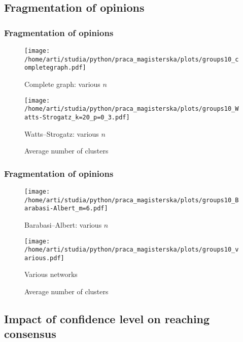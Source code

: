 \documentclass[a4paper, 11pt]{beamer}
\begin{document}
\subsection{Fragmentation of opinions}

\begin{frame}
\frametitle{Fragmentation of opinions}
	\begin{figure}[ht]
		\begin{minipage}[b]{0.45\linewidth}
            \centering
            \texttt{[image: /home/arti/studia/python/praca\_magisterska/plots/groups10\_completegraph.pdf]}
            \caption{Complete graph: various $n$}
        \end{minipage}
        \hspace{0.5cm}
        \begin{minipage}[b]{0.45\linewidth}
            \centering
            \texttt{[image: /home/arti/studia/python/praca\_magisterska/plots/groups10\_Watts-Strogatz\_k=20\_p=0\_3.pdf]}
            \caption{Watts--Strogatz: various $n$}
        \end{minipage}
    \caption{Average number of clusters}
    \end{figure}
\end{frame}

\begin{frame}
\frametitle{Fragmentation of opinions}
	\begin{figure}[ht]
		\begin{minipage}[b]{0.45\linewidth}
            \centering
            \texttt{[image: /home/arti/studia/python/praca\_magisterska/plots/groups10\_Barabasi-Albert\_m=6.pdf]}
            \caption{Barabasi--Albert: various $n$}
        \end{minipage}
        \hspace{0.5cm}
        \begin{minipage}[b]{0.45\linewidth}
            \centering
            \texttt{[image: /home/arti/studia/python/praca\_magisterska/plots/groups10\_various.pdf]}
			\caption{Various networks}
        \end{minipage}
    \caption{Average number of clusters}
    \end{figure}
\end{frame}



\subsection{Impact of confidence level on reaching consensus}
\end{document}
